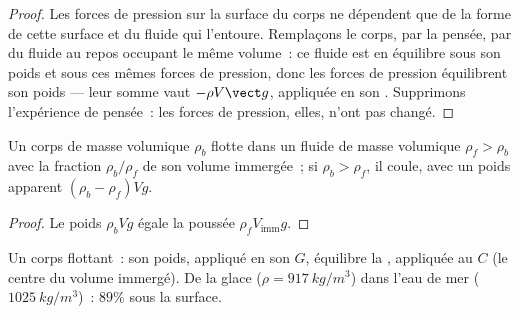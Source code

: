 \begin{proof}
Les forces de pression sur la surface du corps ne dépendent que de la
forme de cette surface et du fluide qui l'entoure. Remplaçons le corps,
par la pensée, par du fluide au repos occupant le même volume~: ce fluide
est en équilibre sous son poids et sous ces mêmes forces de pression, donc
les forces de pression équilibrent son poids --- leur somme vaut
$-\rho V\vect g$, appliquée en son . Supprimons l'expérience
de pensée~: les forces de pression, elles, n'ont pas changé.
\end{proof}

\begin{corollary}[Flottaison]\label{cor:b1:fluid-statics:floating}
Un corps de masse volumique $\rho_b$ flotte dans un fluide de masse
volumique $\rho_f > \rho_b$ avec la fraction $\rho_b/\rho_f$ de son volume
immergée~; si $\rho_b >
\rho_f$, il coule, avec un poids apparent $(\rho_b - \rho_f)Vg$.
\end{corollary}

\begin{proof}
Le poids $\rho_bVg$ égale la poussée $\rho_fV_{\text{imm}}g$.
\end{proof}

\begin{omfigure}

{\small Un corps flottant~: son poids, appliqué en son  $G$,
équilibre la , appliquée au  $C$ (le
centre du volume immergé). De la glace ($\rho = \qty{917}{kg/m^3}$) dans
l'eau de mer ($\qty{1025}{kg/m^3}$)~: $89\%$ sous la surface.}
\end{omfigure}

